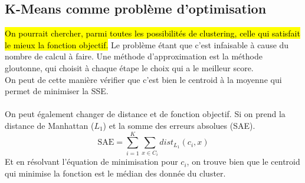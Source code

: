 \documentclass[letterpaper, 12pt]{article}
\newcommand{\alinea}{
\hspace*{0.5cm}}
\begin{document}
		\subsection{K-Means comme problème d'optimisation}
			\alinea \hl{On pourrait chercher, parmi toutes les possibilités de 
				clustering, celle qui satisfait le mieux la fonction objectif.}
				Le problème étant que c'est infaisable à cause du nombre 
				de calcul 
				à faire. Une méthode d'approximation est la méthode gloutonne,
				qui choisit à chaque étape le choix qui a le meilleur score.\\
			\alinea On peut de cette manière vérifier que c'est bien 
				le centroid	à la moyenne qui permet de minimiser la SSE.\\
			~\\
			\alinea On peut également changer de distance et de fonction 
				objectif. Si on prend la distance de Manhattan ($L_1$) 
				et la somme des erreurs absolues (SAE).
				$$ \text{SAE} = \sum^{K}_{i=1} \sum_{x\in C_i} dist_{L_1}
						(c_i, x) $$
				Et en résolvant l'équation de minimisation pour $c_i$, 
				on trouve
				bien que le centroid qui minimise la fonction est le médian
				des donnée du cluster.
\end{document}

